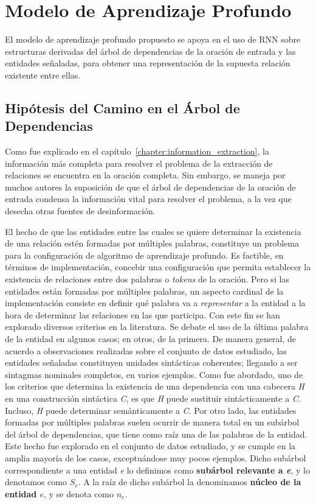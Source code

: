 \section{Modelo de Aprendizaje Profundo}\label{sec:model}

El modelo de aprendizaje profundo propuesto se apoya en el uso de RNN sobre estructuras derivadas del árbol de dependencias de la oración de entrada y las entidades señaladas, para obtener una representación de la supuesta relación existente entre ellas.

\subsection{Hipótesis del Camino en el Árbol de Dependencias}

Como fue explicado en el capítulo~\ref{chapter:information_extraction}, la información más completa para resolver el problema de la extracción de relaciones se encuentra en la oración completa. Sin embargo, se maneja por muchos autores la suposición de que el árbol de dependencias de la oración de entrada condensa la información vital para resolver el problema, a la vez que desecha otras fuentes de desinformación.

El hecho de que las entidades entre las cuales se quiere determinar la existencia de una relación estén formadas por múltiples palabras, constituye un problema para la configuración de algoritmo de aprendizaje profundo.
Es factible, en términos de implementación, concebir una configuración que permita establecer la existencia de relaciones entre dos palabras o \textit{tokens} de la oración.
Pero si las entidades están formadas por múltiples palabras, un aspecto cardinal de la implementación consiste en definir qué palabra va a \textit{representar} a la entidad a la hora de determinar las relaciones en las que participa.
Con este fin se han explorado diversos criterios en la literatura.
Se debate el uso de la última palabra de la entidad en algunos casos; en otros, de la primera.
De manera general, de acuerdo a observaciones realizadas sobre el conjunto de datos estudiado, las entidades señaladas constituyen unidades sintácticas coherentes; llegando a ser sintagmas nominales completos, en varios ejemplos.
Como fue abordado, uno de los criterios que determina la existencia de una dependencia con una cabecera \textit{H} en una construcción sintáctica \textit{C}, es que \textit{H} puede sustituir sintácticamente a \textit{C}.
Incluso, \textit{H} puede determinar semánticamente a \textit{C}.
Por otro lado, las entidades formadas por múltiples palabras suelen ocurrir de manera total en un subárbol del árbol de dependencias, que tiene como raíz una de las palabras de la entidad.
Este hecho fue explorado en el conjunto de datos estudiado, y se cumple en la amplia mayoría de los casos, exceptuándose muy pocos ejemplos.
Dicho subárbol correspondiente a una entidad \textit{e} lo definimos como \textbf{subárbol relevante a \textit{e}}, y lo denotamos como $S_e$.
A la raíz de dicho subárbol la denominamos \textbf{núcleo de la entidad $e$}, y se denota como $n_e$.

